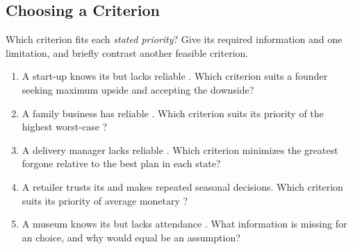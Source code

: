 \subsection{Choosing a Criterion}\label{sec:c8-match}
Which criterion fits each \emph{stated priority}? Give its required information and one limitation, and briefly contrast another feasible criterion.
\begin{enumerate}
\item A start-up knows its  but lacks reliable . Which criterion suits a founder seeking maximum upside and accepting the downside?
\item A family business has reliable . Which criterion suits its priority of the highest worst-case ?
\item A delivery manager lacks reliable . Which criterion minimizes the greatest  forgone relative to the best plan in each state?
\item A retailer trusts its  and makes repeated seasonal decisions. Which criterion suits its priority of average monetary ?
\item A museum knows its  but lacks attendance . What information is missing for an  choice, and why would equal  be an assumption?
\end{enumerate}
